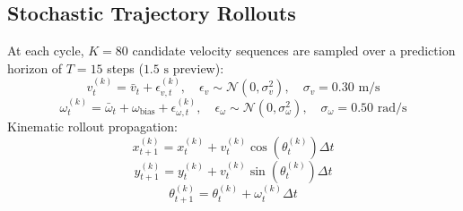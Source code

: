 \documentclass[10pt,a4paper]{article}
\begin{document}
\subsection{Stochastic Trajectory Rollouts}
At each cycle, $K = 80$ candidate velocity sequences are sampled over a prediction horizon of $T = 15$ steps ($1.5\text{ s}$ preview):
\begin{equation}
v_t^{(k)} = \bar{v}_t + \epsilon_{v, t}^{(k)}, \quad \epsilon_v \sim \mathcal{N}(0, \sigma_v^2), \quad \sigma_v = 0.30\text{ m/s}
\end{equation}
\begin{equation}
\omega_t^{(k)} = \bar{\omega}_t + \omega_{\text{bias}} + \epsilon_{\omega, t}^{(k)}, \quad \epsilon_\omega \sim \mathcal{N}(0, \sigma_\omega^2), \quad \sigma_\omega = 0.50\text{ rad/s}
\end{equation}
Kinematic rollout propagation:
\begin{equation}
x_{t+1}^{(k)} = x_t^{(k)} + v_t^{(k)} \cos(\theta_t^{(k)}) \Delta t
\end{equation}
\begin{equation}
y_{t+1}^{(k)} = y_t^{(k)} + v_t^{(k)} \sin(\theta_t^{(k)}) \Delta t
\end{equation}
\begin{equation}
\theta_{t+1}^{(k)} = \theta_t^{(k)} + \omega_t^{(k)} \Delta t
\end{equation}
\end{document}
